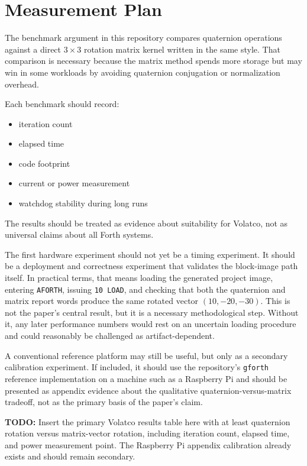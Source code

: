 \documentclass[11pt]{article}
\newcommand{\todoitem}[1]{%
  \par\noindent\textbf{TODO:} #1\par
}
\begin{document}
\section{Measurement Plan}

The benchmark argument in this repository compares quaternion operations against
a direct $3\times 3$ rotation matrix kernel written in the same style. That
comparison is necessary because the matrix method spends more storage but may
win in some workloads by avoiding quaternion conjugation or normalization
overhead.

Each benchmark should record:

\begin{itemize}
\item iteration count
\item elapsed time
\item code footprint
\item current or power measurement
\item watchdog stability during long runs
\end{itemize}

The results should be treated as evidence about suitability for Volatco, not as
universal claims about all Forth systems.

The first hardware experiment should not yet be a timing experiment. It should
be a deployment and correctness experiment that validates the block-image path
itself. In practical terms, that means loading the generated project image,
entering \texttt{AFORTH}, issuing \texttt{10 LOAD}, and checking that both the
quaternion and matrix report words produce the same rotated vector
$ (10, -20, -30) $. This is not the paper's central result, but it is a
necessary methodological step. Without it, any later performance numbers would
rest on an uncertain loading procedure and could reasonably be challenged as
artifact-dependent.

A conventional reference platform may still be useful, but only as a secondary
calibration experiment. If included, it should use the repository's
\texttt{gforth} reference implementation on a machine such as a Raspberry Pi
and should be presented as appendix evidence about the qualitative
quaternion-versus-matrix tradeoff, not as the primary basis of the paper's
claim.

\todoitem{Insert the primary Volatco results table here with at least
quaternion rotation versus matrix-vector rotation, including iteration count,
elapsed time, and power measurement point. The Raspberry Pi appendix
calibration already exists and should remain secondary.}
\end{document}
